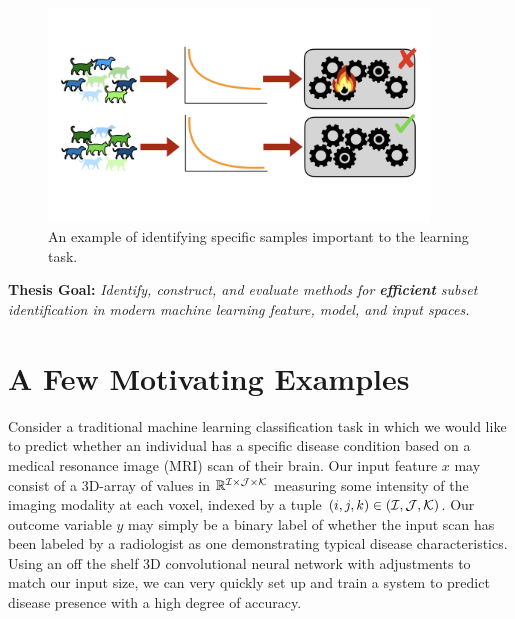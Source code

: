 \begin{figure}
    \centering
    \includegraphics[trim={0 4.5cm 0 4cm},clip,width=0.9\textwidth]{1_intro/figs/sample_select.png}
    \caption[Visualization of sample selection]{An example of identifying specific samples important to the learning task.}
    \label{fig:sample_select}
\end{figure}


\begin{mdframed}[style=MyFrame]
\textbf{ Thesis Goal: }
\em Identify, construct, and evaluate methods for \textbf{efficient} subset identification in modern machine learning feature, model, and input spaces.
\end{mdframed}

\section{A Few Motivating Examples}
Consider a traditional machine learning classification task in which we would like to predict whether an individual has a specific disease condition based on a medical resonance image (MRI) scan of their brain. Our input feature $x$ may consist of a 3D-array of values in $\mathbb{R}^{\mathcal{I}\times \mathcal{J}\times \mathcal{K}}$ measuring some intensity of the imaging modality at each voxel, indexed by a tuple $(i,j,k) \in (\mathcal{I},\mathcal{J},\mathcal{K})$.
Our outcome variable $y$ may simply be a binary label of whether the input scan has been labeled by a radiologist as one demonstrating typical disease characteristics.
Using an off the shelf 3D convolutional neural network with adjustments to match our input size, we can very quickly set up and train a system to predict disease presence with a high degree of accuracy.

